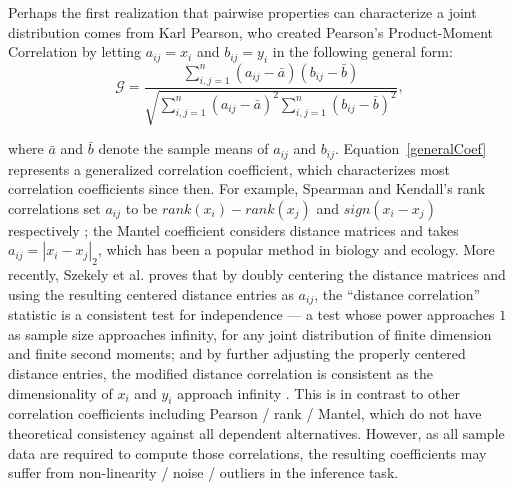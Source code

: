 \documentclass[11pt]{article}
\newcommand{\G}{\mathcal{G}}
\begin{document}
Perhaps the first realization that pairwise properties can characterize a joint distribution comes from  Karl Pearson, who created Pearson's Product-Moment Correlation \cite{Pearson1895} by letting $a_{ij}=x_i$ and $b_{ij}=y_i$ in the following general form:
\begin{equation}
\label{generalCoef}
\G=\frac{\sum_{i,j=1}^n (a_{ij}-\bar{a}) (b_{ij}-\bar{b})}{\sqrt{\sum_{i,j=1}^n  (a_{ij}-\bar{a})^{2} \sum_{i,j=1}^n (b_{ij}-\bar{b})^{2}}}, 
\end{equation}

where $\bar{a}$ and $\bar{b}$ denote the sample means of $a_{ij}$ and $b_{ij}$. Equation~\ref{generalCoef} represents a generalized correlation coefficient, which characterizes most correlation coefficients since then.  For example, Spearman and Kendall's rank correlations set $a_{ij}$ to be $rank(x_i)-rank(x_j)$ and $sign(x_i-x_j)$ respectively \cite{KendallBook}; the Mantel coefficient \cite{Mantel1967} considers distance matrices and takes $a_{ij}=|x_i-x_j|_{2}$, which has been a popular method in biology and ecology. More recently, Szekely et al. \cite{SzekelyRizzoBakirov2007} proves that by doubly centering the distance matrices and using the resulting centered distance entries as $a_{ij}$, the ``distance correlation'' statistic is a consistent test for independence --- a test whose power approaches $1$ as sample size approaches infinity, for any joint distribution of finite dimension and finite second moments; and by further adjusting the properly centered distance entries, the modified distance correlation is consistent as the dimensionality of $x_{i}$ and $y_{i}$ approach infinity \cite{SzekelyRizzo2013a}. This is in contrast to other correlation coefficients including Pearson / rank / Mantel, which do not have theoretical consistency against all dependent alternatives. However, as all sample data are required to compute those correlations, the resulting coefficients may suffer from non-linearity / noise / outliers in the inference task.
\end{document}
